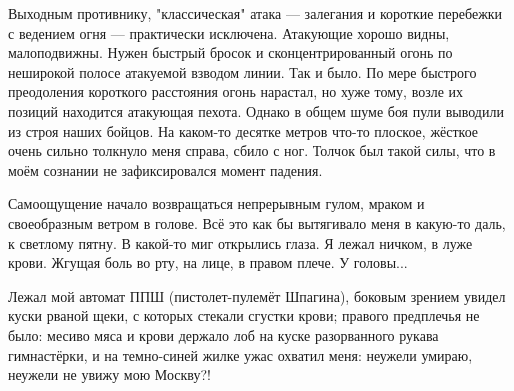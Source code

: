 \label{9-1}
Выходным противнику, "классическая" атака — залегания и короткие перебежки с ведением огня — практически исключена. Атакующие хорошо видны, малоподвижны. Нужен быстрый бросок и сконцентрированный огонь по неширокой полосе атакуемой взводом линии. Так и было. По мере быстрого преодоления короткого расстояния огонь нарастал, но хуже тому, возле их позиций находится атакующая пехота. Однако в общем шуме боя пули выводили из строя наших бойцов. На каком-то десятке метров что-то плоское, жёсткое очень сильно толкнуло меня справа, сбило с ног. Толчок был такой силы, что в моём сознании не зафиксировался момент падения.

\label{9-2}
Самоощущение начало возвращаться непрерывным гулом, мраком и своеобразным ветром в голове. Всё это как бы вытягивало меня в какую-то даль, к светлому пятну. В какой-то миг открылись глаза. Я лежал ничком, в луже крови. Жгущая боль во рту, на лице, в правом плече. У головы...

\label{10-1}
Лежал мой автомат ППШ (пистолет-пулемёт Шпагина), боковым зрением увидел куски рваной щеки, с которых стекали сгустки крови; правого предплечья не было: месиво мяса и крови держало лоб на куске разорванного рукава гимнастёрки, и на темно-синей жилке ужас охватил меня: неужели умираю, неужели не увижу мою Москву?!
